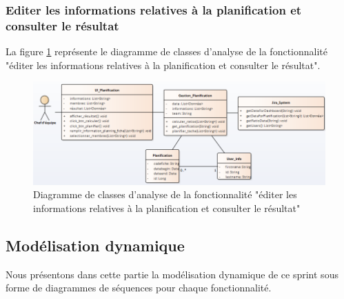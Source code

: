\subsubsection{Editer les informations relatives à la planification et consulter le résultat}
La figure \ref{code79} représente le diagramme de classes d'analyse de la fonctionnalité "éditer les informations relatives à la planification et consulter le résultat".
\begin{figure}[H]
  \centering
 \includegraphics[scale=0.75]{figures/diagrams/class/planification_class_diag.png}
 \caption{Diagramme de classes d'analyse de la fonctionnalité "éditer les informations relatives à la planification et consulter le résultat"}
 \label{code79}
\end{figure}

\subsection{Modélisation dynamique}
Nous présentons dans cette partie la modélisation dynamique de ce sprint sous forme de diagrammes de séquences pour chaque fonctionnalité.


